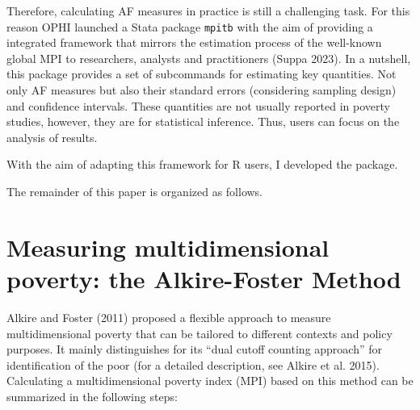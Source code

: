 Therefore, calculating AF measures in practice is still a challenging task. For this reason OPHI launched a Stata package \texttt{mpitb} with the aim of providing a integrated framework that mirrors the estimation process of the well-known global MPI to researchers, analysts and practitioners (Suppa 2023). In a nutshell, this package provides a set of subcommands for estimating key quantities. Not only AF measures but also their standard errors (considering sampling design) and confidence intervals. These quantities are not usually reported in poverty studies, however, they are for statistical inference. Thus, users can focus on the analysis of results.

With the aim of adapting this framework for R users, I developed the  package.

The remainder of this paper is organized as follows.

\hypertarget{measuring-multidimensional-poverty-the-alkire-foster-method}{%
\section{Measuring multidimensional poverty: the Alkire-Foster Method}\label{measuring-multidimensional-poverty-the-alkire-foster-method}}

Alkire and Foster (2011) proposed a flexible approach to measure multidimensional poverty that can be tailored to different contexts and policy purposes. It mainly distinguishes for its ``dual cutoff counting approach'' for identification of the poor (for a detailed description, see Alkire et al. 2015). Calculating a multidimensional poverty index (MPI) based on this method can be summarized in the following steps:

